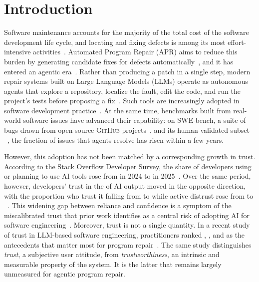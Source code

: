 \section{Introduction}
\label{sec:intro}

Software maintenance accounts for the majority of the total cost of the software
development life cycle, and locating and fixing defects is among its most effort-intensive
activities~\cite{}. Automated Program Repair (APR) aims to reduce this
burden by generating candidate fixes for defects automatically~\cite{legoues2019apr}, and
it has entered an agentic era~\cite{}. Rather than producing a
patch in a single step, modern repair systems built on Large Language Models (LLMs)
operate as autonomous agents that explore a repository, localize the fault, edit the
code, and run the project's tests before proposing a fix~\cite{yang2024sweagent,
zhang2024autocoderover}. Such tools are increasingly adopted in software development
practice~\cite{so2024, so2025}. At the same time, benchmarks built from real-world software
issues have advanced their capability: on SWE-bench, a suite of bugs drawn from
open-source \textsc{GitHub} projects~\cite{jimenez2024swebench}, and its human-validated
subset \sweBenchVerified{}~\cite{swebenchverified2024}, the fraction of issues that
agents resolve has risen within a few years.

However, this adoption has not been matched by a corresponding growth in trust.
According to the Stack Overflow Developer Survey, the share of developers using or
planning to use AI tools rose from \aiAdoptionPrev{} in 2024 to \aiAdoptionCur{} in
2025~\cite{so2024, so2025}. Over the same period, however, developers' trust in the
\accuracy{} of AI output moved in the opposite direction, with the proportion who
trust it falling from \aiTrustPrev{} to \aiTrustCur{} while active distrust rose from
\aiDistrustPrev{} to \aiDistrustCur{}~\cite{so2024, so2025}. This widening gap between
reliance and confidence is a symptom of the miscalibrated trust that prior work
identifies as a central risk of adopting AI for software engineering~\cite{khati2025mapping}.
Moreover, trust is not a single quantity. In a recent study of trust in LLM-based
software engineering, practitioners ranked \accuracy{}, \interpretability{}, and \robustness{} as
the antecedents that matter most for program repair~\cite{khati2025mapping}. The same study
distinguishes
\emph{trust}, a subjective user attitude, from \emph{trustworthiness}, an intrinsic and
measurable property of the system. It is the latter that remains largely unmeasured
for agentic program repair.

